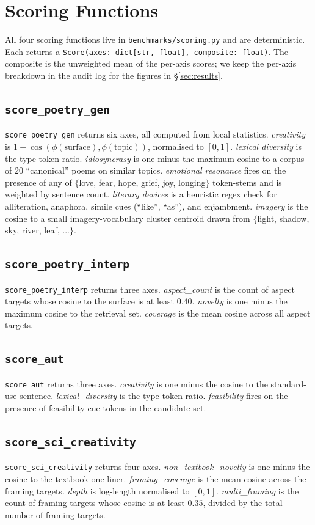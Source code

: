 \section{Scoring Functions}\label{app:scoring}

\sloppy

All four scoring functions live in \texttt{benchmarks/scoring.py} and are deterministic. Each returns a \texttt{Score(axes: dict[str, float], composite: float)}. The composite is the unweighted mean of the per-axis scores; we keep the per-axis breakdown in the audit log for the figures in \S\ref{sec:results}.

\subsection{\texttt{score\_poetry\_gen}}
\texttt{score\_poetry\_gen} returns six axes, all computed from local statistics. \emph{creativity} is $1 - \cos(\phi(\text{surface}), \phi(\text{topic}))$, normalised to $[0, 1]$. \emph{lexical diversity} is the type-token ratio. \emph{idiosyncrasy} is one minus the maximum cosine to a corpus of 20 ``canonical'' poems on similar topics. \emph{emotional resonance} fires on the presence of any of $\{$love, fear, hope, grief, joy, longing$\}$ token-stems and is weighted by sentence count. \emph{literary devices} is a heuristic regex check for alliteration, anaphora, simile cues (``like'', ``as''), and enjambment. \emph{imagery} is the cosine to a small imagery-vocabulary cluster centroid drawn from $\{$light, shadow, sky, river, leaf, ...$\}$.

\subsection{\texttt{score\_poetry\_interp}}
\texttt{score\_poetry\_interp} returns three axes. \emph{aspect\_count} is the count of aspect targets whose cosine to the surface is at least $0.40$. \emph{novelty} is one minus the maximum cosine to the retrieval set. \emph{coverage} is the mean cosine across all aspect targets.

\subsection{\texttt{score\_aut}}
\texttt{score\_aut} returns three axes. \emph{creativity} is one minus the cosine to the standard-use sentence. \emph{lexical\_diversity} is the type-token ratio. \emph{feasibility} fires on the presence of feasibility-cue tokens in the candidate set.

\subsection{\texttt{score\_sci\_creativity}}
\texttt{score\_sci\_creativity} returns four axes. \emph{non\_textbook\_novelty} is one minus the cosine to the textbook one-liner. \emph{framing\_coverage} is the mean cosine across the framing targets. \emph{depth} is log-length normalised to $[0,1]$. \emph{multi\_framing} is the count of framing targets whose cosine is at least $0.35$, divided by the total number of framing targets.
